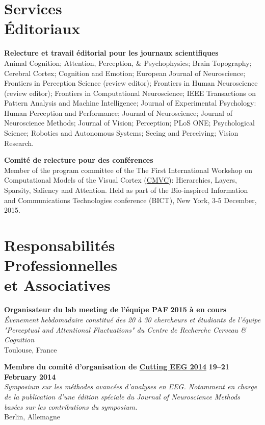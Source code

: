 \documentclass[margin,line]{resume}
\begin{document}
\begin{resume}
\vspace{3mm}
\section{\mysidestyle Services\\\'Editoriaux}
 
 \textbf{Relecture et travail éditorial pour les journaux scientifiques} \\
Animal Cognition; 
Attention, Perception, \& Psychophysics; 
Brain Topography;  
Cerebral Cortex; 
Cognition and Emotion;
European Journal of Neuroscience;
Frontiers in Perception Science (review editor); 
Frontiers in Human Neuroscience (review editor); 
Frontiers in Computational Neuroscience; 
IEEE Transactions on Pattern Analysis and Machine Intelligence;
Journal of Experimental Psychology: Human Perception and Performance;
Journal of Neuroscience;
Journal of Neuroscience Methods;
Journal of Vision;
Perception;
PLoS ONE; 
Psychological Science;
Robotics and Autonomous Systems;
Seeing and Perceiving;
Vision Research.

\textbf{Comité de relecture pour des conférences} \\
Member of the program committee of the The First International Workshop on Computational Models of the Visual Cortex (\href{http://cmvc.bionetics.org/2015/show/home}{CMVC}): Hierarchies, Layers, Sparsity, Saliency and Attention. Held as part of the Bio-inspired Information and Communications Technologies conference (BICT), New York, 3-5 December, 2015.

\newpage

\vspace{3mm}
    \section{\mysidestyle Responsabilités\\ Professionnelles\\ et Associatives}

	\textbf{Organisateur du lab meeting  de l'équipe PAF} \hfill \textbf{2015 à en cours}\\
	\textsl{\'Evenement hebdomadaire constitué des 20 à 30 chercheurs et étudiants de l'équipe "Perceptual and Attentional Fluctuations" du Centre de Recherche Cerveau \& Cognition}\\
	Toulouse, France

	\vspace{-2mm} 
	\textbf{Membre du comité d'organisation de \href{http://www.mind-and-brain.de/postdoctoral-program/scientific-events/archive/cutting-eeg/}{Cutting EEG 2014}} \hfill \textbf{19--21 February 2014}\\
	\textsl{Symposium sur les méthodes avancées d'analyses en EEG. Notamment en charge de la publication d'une édition spéciale du Journal of Neuroscience Methods basées sur les contributions du symposium.}\\
	Berlin, Allemagne


\end{resume}
\end{document}
